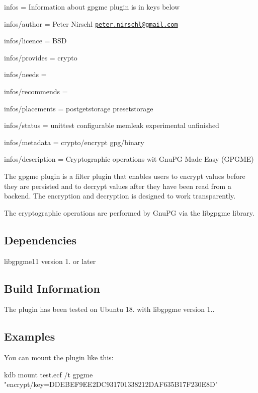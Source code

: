
\begin{DoxyItemize}
\item infos = Information about gpgme plugin is in keys below
\item infos/author = Peter Nirschl \href{mailto:peter.nirschl@gmail.com}{\tt peter.\+nirschl@gmail.\+com}
\item infos/licence = B\+SD
\item infos/provides = crypto
\item infos/needs =
\item infos/recommends =
\item infos/placements = postgetstorage presetstorage
\item infos/status = unittest configurable memleak experimental unfinished
\item infos/metadata = crypto/encrypt gpg/binary
\item infos/description = Cryptographic operations wit Gnu\+PG Made Easy (G\+P\+G\+ME)
\end{DoxyItemize}

The {\ttfamily gpgme} plugin is a filter plugin that enables users to encrypt values before they are persisted and to decrypt values after they have been read from a backend. The encryption and decryption is designed to work transparently.

The cryptographic operations are performed by Gnu\+PG via the {\ttfamily libgpgme} library.

\subsection*{Dependencies}


\begin{DoxyItemize}
\item {\ttfamily libgpgme11} version 1. or later
\end{DoxyItemize}

\subsection*{Build Information}

The plugin has been tested on Ubuntu 18. with {\ttfamily libgpgme} version 1..

\subsection*{Examples}

You can mount the plugin like this\+: \begin{DoxyVerb}    kdb mount test.ecf /t gpgme "encrypt/key=DDEBEF9EE2DC931701338212DAF635B17F230E8D"
\end{DoxyVerb}


